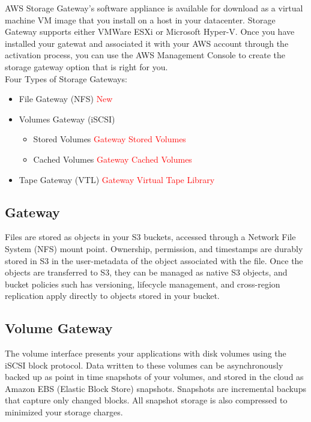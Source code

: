 \documentclass{article}
\begin{document}
\noindent
AWS Storage Gateway's software appliance is available for download as a virtual machine VM image that you install on a host in your datacenter. Storage Gateway supports either VMWare ESXi or Microsoft Hyper-V. Once you have installed your gatewat and associated it with your AWS account through the activation process, you can use the AWS Management Console to create the storage gateway option that is right for you.\\

Four Types of Storage Gateways: 
\begin{itemize}
	\item
	File Gateway (NFS) \textcolor{red}{New}
	
	\item
	Volumes Gateway (iSCSI)
	\begin{itemize}
		\item
		Stored Volumes	\textcolor{red}{Gateway Stored Volumes}
		
		\item
		Cached Volumes  \textcolor{red}{Gateway Cached Volumes}
	\end{itemize}
	
	\item
	Tape Gateway (VTL) \textcolor{red}{Gateway Virtual Tape Library}
\end{itemize}

\subsection{Gateway}
Files are stored as objects in your S3 buckets, accessed through a Network File System (NFS) mount point. Ownership, permission, and timestamps are durably stored in S3 in the user-metadata of the object associated with the file. Once the objects are transferred to S3, they can be managed as native S3 objects, and bucket policies such has versioning, lifecycle management, and cross-region replication apply directly to objects stored in your bucket. \\


\subsection{Volume Gateway}
The volume interface presents your applications with disk volumes using the iSCSI block protocol. Data written to these volumes can be asynchronously backed up as point in time snapshots of your volumes, and stored in the cloud as Amazon EBS (Elastic Block Store) snapshots. Snapshots are incremental backups that capture only changed blocks. All snapshot storage is also compressed to minimized your storage charges.\\
\end{document}
